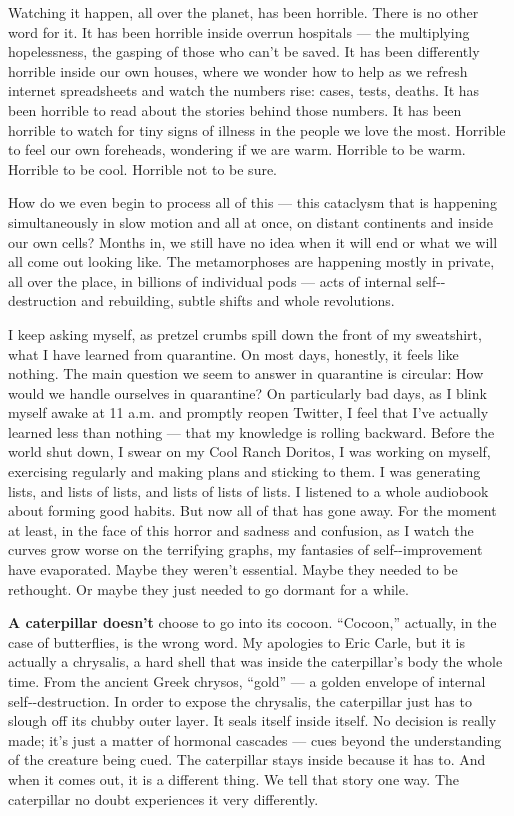 Watching it happen, all over the planet, has been horrible. There is no
other word for it. It has been horrible inside overrun hospitals --- the
multiplying hopelessness, the gasping of those who can't be saved. It
has been differently horrible inside our own houses, where we wonder how
to help as we refresh internet spreadsheets and watch the numbers rise:
cases, tests, deaths. It has been horrible to read about the stories
behind those numbers. It has been horrible to watch for tiny signs of
illness in the people we love the most. Horrible to feel our own
foreheads, wondering if we are warm. Horrible to be warm. Horrible to be
cool. Horrible not to be sure.

How do we even begin to process all of this --- this cataclysm that is
happening simultaneously in slow motion and all at once, on distant
continents and inside our own cells? Months in, we still have no idea
when it will end or what we will all come out looking like. The
metamorphoses are happening mostly in private, all over the place, in
billions of individual pods --- acts of internal self-\/-destruction and
rebuilding, subtle shifts and whole revolutions.

I keep asking myself, as pretzel crumbs spill down the front of my
sweatshirt, what I have learned from quarantine. On most days, honestly,
it feels like nothing. The main question we seem to answer in quarantine
is circular: How would we handle ourselves in quarantine? On
particularly bad days, as I blink myself awake at 11 a.m. and promptly
reopen Twitter, I feel that I've actually learned less than nothing ---
that my knowledge is rolling backward. Before the world shut down, I
swear on my Cool Ranch Doritos, I was working on myself, exercising
regularly and making plans and sticking to them. I was generating lists,
and lists of lists, and lists of lists of lists. I listened to a whole
audiobook about forming good habits. But now all of that has gone away.
For the moment at least, in the face of this horror and sadness and
confusion, as I watch the curves grow worse on the terrifying graphs, my
fantasies of self-\/-improvement have evaporated. Maybe they weren't
essential. Maybe they needed to be rethought. Or maybe they just needed
to go dormant for a while.

\textbf{A caterpillar doesn't} choose to go into its cocoon. ``Cocoon,''
actually, in the case of butterflies, is the wrong word. My apologies to
Eric Carle, but it is actually a chrysalis, a hard shell that was inside
the caterpillar's body the whole time. From the ancient Greek chrysos,
``gold'' --- a golden envelope of internal self-\/-destruction. In order
to expose the chrysalis, the caterpillar just has to slough off its
chubby outer layer. It seals itself inside itself. No decision is really
made; it's just a matter of hormonal cascades --- cues beyond the
understanding of the creature being cued. The caterpillar stays inside
because it has to. And when it comes out, it is a different thing. We
tell that story one way. The caterpillar no doubt experiences it very
differently.

